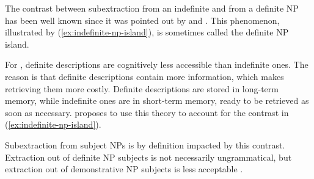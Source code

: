 
The contrast between subextraction from an indefinite and from a definite NP has been well known since it was pointed out by \citet{Chomsky.1973} and \citet{Erteschik-Shir.1973}. This phenomenon, illustrated by (\ref{ex:indefinite-np-island}), is sometimes called the definite NP island.

\begin{exe}
\ex \citep{Radford.2009} \label{ex:indefinite-np-island}
\begin{xlist}
\end{xlist}
\end{exe}

For \citet{Ariel.1988}, definite descriptions are cognitively less accessible than indefinite ones. The reason is that definite descriptions contain more information, which makes retrieving them more costly. Definite descriptions are stored in long-term memory, while indefinite ones are in short-term memory, ready to be retrieved as soon as necessary. \citet[269]{Kluender.1998} proposes to use this theory to account for the contrast in (\ref{ex:indefinite-np-island}).

Subextraction from subject NPs is by definition impacted by this contrast. Extraction out of definite NP subjects is not necessarily ungrammatical, but extraction out of demonstrative NP subjects is less acceptable \citep{Jimenez-Fernandez.2009}.

\begin{exe}
\ex \citep[117]{Jimenez-Fernandez.2009}
\begin{xlist}
\end{xlist}
\end{exe}

